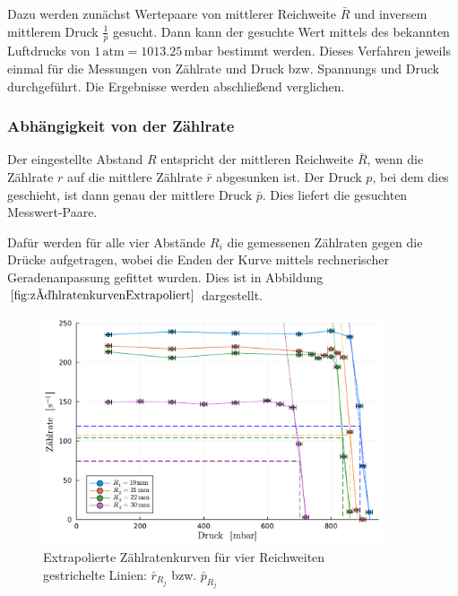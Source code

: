 \documentclass[12pt,a4paper]{scrartcl}
\numberwithin{equation}{section} %
\begin{document}
Dazu werden zunächst Wertepaare von mittlerer Reichweite $\bar{R}$ und inversem mittlerem Druck $\frac{1}{\bar{p}}$ gesucht. Dann kann der gesuchte Wert mittels des bekannten Luftdrucks von $1 \mathrm{\,atm} = 1013.25 \mathrm{\,mbar}$ bestimmt werden. Dieses Verfahren jeweils einmal für die Messungen von Zählrate und Druck bzw. Spannungs und Druck durchgeführt. Die Ergebnisse werden abschließend verglichen.

\hypertarget{bestimmung-durch-zuxe4hlraten}{%
\subsubsection{Abhängigkeit von der Zählrate}\label{bestimmung-durch-zuxe4hlraten}}

Der eingestellte Abstand $R$ entspricht der mittleren Reichweite $\bar{R}$, wenn die Zählrate $r$ auf die mittlere Zählrate $\bar{r}$ abgesunken ist. Der Druck $p$, bei dem dies geschieht, ist dann genau der mittlere Druck $\bar{p}$. Dies liefert die gesuchten Messwert-Paare.

Dafür werden für alle vier Abstände $R_i$ die gemessenen Zählraten gegen die Drücke aufgetragen, wobei die Enden der Kurve mittels rechnerischer Geradenanpassung gefittet wurden. Dies ist in Abbildung $\ref{fig:zählratenkurvenExtrapoliert}$ dargestellt.

\begin{figure}[H]
	\centering
	\includegraphics[width=0.9\textwidth]{../media/B3.3/zaehlratenkurven extrapoliert.pdf}
	\caption{Extrapolierte Zählratenkurven für vier Reichweiten\\
			gestrichelte Linien: $\bar r_{R_j}$ bzw. $\bar p_{R_j}$}
	\label{fig:zählratenkurvenExtrapoliert}
\end{figure}
\end{document}
